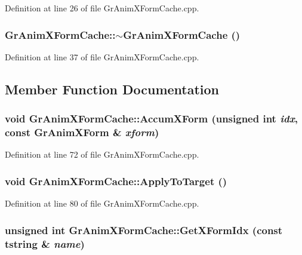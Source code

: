 Definition at line 26 of file GrAnimXFormCache.cpp.\hypertarget{class_gr_anim_x_form_cache_b5989d0db3961f67a55a73750e16441f}{
\subsubsection[{$\sim$GrAnimXFormCache}]{\setlength{\rightskip}{0pt plus 5cm}GrAnimXFormCache::$\sim$GrAnimXFormCache ()}}
\label{class_gr_anim_x_form_cache_b5989d0db3961f67a55a73750e16441f}




Definition at line 37 of file GrAnimXFormCache.cpp.

\subsection{Member Function Documentation}
\hypertarget{class_gr_anim_x_form_cache_a037a5ae12d0b02541a4be1db9f2bba6}{
\subsubsection[{AccumXForm}]{\setlength{\rightskip}{0pt plus 5cm}void GrAnimXFormCache::AccumXForm (unsigned int {\em idx}, \/  const {\bf GrAnimXForm} \& {\em xform})}}
\label{class_gr_anim_x_form_cache_a037a5ae12d0b02541a4be1db9f2bba6}




Definition at line 72 of file GrAnimXFormCache.cpp.\hypertarget{class_gr_anim_x_form_cache_f2f87fb05ab8bfbf518c4010fc5570cb}{
\subsubsection[{ApplyToTarget}]{\setlength{\rightskip}{0pt plus 5cm}void GrAnimXFormCache::ApplyToTarget ()}}
\label{class_gr_anim_x_form_cache_f2f87fb05ab8bfbf518c4010fc5570cb}




Definition at line 80 of file GrAnimXFormCache.cpp.\hypertarget{class_gr_anim_x_form_cache_2c79a305406c877727e26d7f453cf306}{
\subsubsection[{GetXFormIdx}]{\setlength{\rightskip}{0pt plus 5cm}unsigned int GrAnimXFormCache::GetXFormIdx (const {\bf tstring} \& {\em name})}}
\label{class_gr_anim_x_form_cache_2c79a305406c877727e26d7f453cf306}




